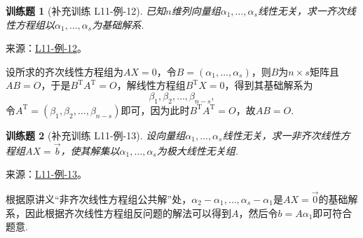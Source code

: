 \documentclass[12pt,fontset=fandol]{ctexart}
\newtheorem{exercise}{训练题}[section]
\begin{document}
\begin{exercise}[补充训练 L11-例-12]\label{prob:L11-例-12}
已知$n$维列向量组$\alpha_1,\ldots,\alpha_s$线性无关，求一齐次线性方程组以$\alpha_1,\ldots,\alpha_s$为基础解系.
\end{exercise}
\noindent 来源：\href{https://github.com/yhwu-is/Linear-Algebra-Left-Undone/blob/new/%E8%AE%B2%E4%B9%89/%E4%B8%93%E9%A2%98/11%20%E6%9C%9D%E8%8A%B1%E5%A4%95%E6%8B%BE.tex}{L11-例-12}。
\begin{solve}
设所求的齐次线性方程组为$AX=0$，令$B=(\alpha_1,\ldots,\alpha_s)$，则$B$为$n\times s$矩阵且$AB=O$，于是$B^\mathrm{T}A^\mathrm{T}=O$，解线性方程组$B^\mathrm{T}X=0$，得到其基础解系为
    \[\beta_1,\beta_2,\ldots,\beta_{n-s},\]
    令$A^\mathrm{T}=(\beta_1,\beta_2,\ldots,\beta_{n-s})$即可，因为此时$B^\mathrm{T}A^\mathrm{T}=O$，故$AB=O$.
\end{solve}

\begin{exercise}[补充训练 L11-例-13]\label{prob:L11-例-13}
设向量组$\alpha_1,\ldots,\alpha_s$线性无关，求一非齐次线性方程组$AX=\vec{b}$，使其解集以$\alpha_1,\ldots,\alpha_s$为极大线性无关组.
\end{exercise}
\noindent 来源：\href{https://github.com/yhwu-is/Linear-Algebra-Left-Undone/blob/new/%E8%AE%B2%E4%B9%89/%E4%B8%93%E9%A2%98/11%20%E6%9C%9D%E8%8A%B1%E5%A4%95%E6%8B%BE.tex}{L11-例-13}。
\begin{solve}
根据原讲义“非齐次线性方程组公共解”处，$\alpha_2-\alpha_1,\ldots,\alpha_s-\alpha_1$是$AX=\vec{0}$的基础解系，因此根据齐次线性方程组反问题的解法可以得到$A$，然后令$b=A\alpha_1$即可符合题意.
\end{solve}
\end{document}
